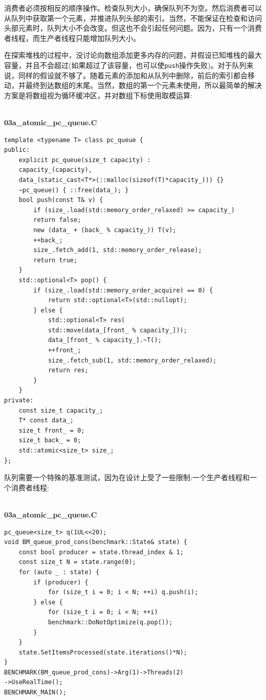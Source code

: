 消费者必须按相反的顺序操作。检查队列大小，确保队列不为空。然后消费者可以从队列中获取第一个元素，并推进队列头部的索引。当然，不能保证在检查和访问头部元素时，队列大小不会改变。但这也不会引起任何问题。因为，只有一个消费者线程，而生产者线程只能增加队列大小。

在探索堆栈的过程中，没讨论向数组添加更多内存的问题，并假设已知堆栈的最大容量，并且不会超过(如果超过了该容量，也可以使\texttt{push}操作失败)。对于队列来说，同样的假设就不够了。随着元素的添加和从队列中删除，前后的索引都会移动，并最终到达数组的末尾。当然，数组的第一个元素未使用，所以最简单的解决方案是将数组视为循环缓冲区，并对数组下标使用取模运算:

\hspace*{\fill} \\ %
\noindent
\textbf{03a\_atomic\_pc\_queue.C}
\begin{lstlisting}[style=styleCXX]
template <typename T> class pc_queue {
public:
	explicit pc_queue(size_t capacity) : 
	capacity_(capacity),
	data_(static_cast<T*>(::malloc(sizeof(T)*capacity_))) {}
	~pc_queue() { ::free(data_); }
	bool push(const T& v) {
		if (size_.load(std::memory_order_relaxed) >= capacity_)
		return false;
		new (data_ + (back_ % capacity_)) T(v);
		++back_;
		size_.fetch_add(1, std::memory_order_release);
		return true;
	}
	std::optional<T> pop() {
		if (size_.load(std::memory_order_acquire) == 0) {
			return std::optional<T>(std::nullopt);
		} else {
			std::optional<T> res(
			std::move(data_[front_ % capacity_]));
			data_[front_ % capacity_].~T();
			++front_;
			size_.fetch_sub(1, std::memory_order_relaxed);
			return res;
		}
	}
private:
	const size_t capacity_;
	T* const data_;
	size_t front_ = 0;
	size_t back_ = 0;
	std::atomic<size_t> size_;
};
\end{lstlisting}

队列需要一个特殊的基准测试，因为在设计上受了一些限制:一个生产者线程和一个消费者线程:

\hspace*{\fill} \\ %
\noindent
\textbf{03a\_atomic\_pc\_queue.C}
\begin{lstlisting}[style=styleCXX]
pc_queue<size_t> q(1UL<<20);
void BM_queue_prod_cons(benchmark::State& state) {
	const bool producer = state.thread_index & 1;
	const size_t N = state.range(0);
	for (auto _ : state) {
		if (producer) {
			for (size_t i = 0; i < N; ++i) q.push(i);
		} else {
			for (size_t i = 0; i < N; ++i) 
			benchmark::DoNotOptimize(q.pop());
		}
	}
	state.SetItemsProcessed(state.iterations()*N);
}
BENCHMARK(BM_queue_prod_cons)->Arg(1)->Threads(2)
->UseRealTime();
BENCHMARK_MAIN();
\end{lstlisting}

